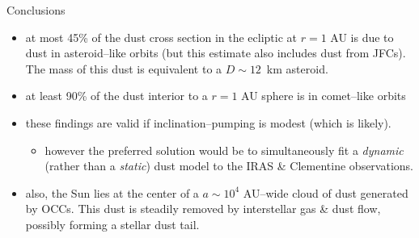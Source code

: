 \documentclass[20pt,35mmSlide,landscape]{foils}
\begin{document}
\hspace*{-0.5in}\parbox{10.0in}{
\vspace*{-1in}\begin{center}
{\large Conclusions\vspace*{1ex}}
\end{center}

\begin{itemize}
\item at most 45\% of the dust cross section in the ecliptic
at $r=1$ AU is due to dust in asteroid--like orbits
(but this estimate also includes dust from JFCs).
The mass of this dust is equivalent to a \mbox{$D\sim12$ km} asteroid.

\item at least 90\% of the dust interior to a $r=1$ AU sphere
is in comet--like orbits

\item these findings are valid if inclination--pumping
is modest (which is likely).

\begin{itemize}

\item however the preferred solution would be to simultaneously
fit a {\sl dynamic} (rather than a {\sl static}) dust model
to the IRAS \& Clementine observations.

\end{itemize}

\item also, the Sun lies at the center of a $a\sim10^4$ AU--wide 
cloud of dust generated by OCCs. This dust is steadily removed
by interstellar gas \& dust flow, possibly forming a stellar dust
tail.

\end{itemize}

}
\end{document}
